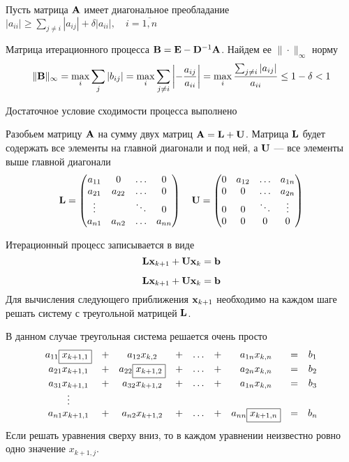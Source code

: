 \documentclass[professionalfonts,compress,unicode]{beamer}
\begin{document}
{
	Пусть матрица ${\bf A}$ имеет диагональное преобладание
	$|a_{ii}| \geq \sum_{j \neq i} |a_{ij}| + \delta |a_{ii}|, \quad i=\overline{1,n}$
	
	Матрица итерационного процесса ${\bf B} = {\bf E} - {\bf D}^{-1}{\bf A}$. Найдем ее $\|\cdot\|_\infty$ норму
	$$
	\|{\bf B}\|_\infty = \max_i\sum_j|b_{ij}| = \max_i \sum_{j\neq i} \left|-\frac{a_{ij}}{a_{ii}}\right| = 
	\max_i \frac{\sum_{j\neq i} |a_{ij}|}{a_{ii}} \leq 1-\delta < 1
	$$
	
	Достаточное условие сходимости процесса выполнено
}

{
	Разобьем матрицу ${\bf A}$ на сумму двух матриц ${\bf A} = {\bf L} + {\bf U}$. 
	Матрица ${\bf L}$ будет содержать все элементы на главной диагонали и под ней, а ${\bf U}$ --- все элементы 
	выше главной диагонали
	$$
	{\bf L} = \begin{pmatrix}
		a_{11}&0&\dots&0\\
		a_{21}&a_{22}&\dots&0\\
		\vdots&&\ddots&0\\
		a_{n1}&a_{n2}&\dots&a_{nn}
	\end{pmatrix}
	\quad
	{\bf U} = \begin{pmatrix}
		0&a_{12}&\dots&a_{1n}\\
		0&0&\dots&a_{2n}\\
		0&0&\ddots&\vdots\\
		0&0&0&0\\
	\end{pmatrix}
	$$
	
	Итерационный процесс записывается в виде
	$$
	{\bf L} {\bf x}_{k+1} + {\bf U} {\bf x}_k = {\bf b}
	$$
}

{
	$$
	{\bf L} {\bf x}_{k+1} + {\bf U} {\bf x}_k = {\bf b}
	$$
	Для вычисления следующего приближения ${\bf x}_{k+1}$ необходимо на каждом шаге решать систему с треугольной матрицей ${\bf L}$. 
	
	В данном случае треугольная система решается очень просто
	\begin{equation*}
	\begin{array}{ccccccccc}
	a_{11} \fbox{$x_{k+1,1}$} &+& a_{12} x_{k,2}  &+& \dots &+& a_{1n} x_{k,n} &=& b_1\\
	a_{21} x_{k+1,1} &+& a_{22} \fbox{$x_{k+1,2}$} &+& \dots &+& a_{2n} x_{k,n} &=& b_2\\
	a_{31} x_{k+1,1} &+& a_{32} x_{k+1,2} &+& \dots &+& a_{1n} x_{k,n} &=& b_3\\
	\vdots\\
	a_{n1} x_{k+1,1} &+& a_{n2} x_{k+1,2} &+& \dots &+& a_{nn} \fbox{$x_{k+1,n}$} &=& b_n
	\end{array}
	\end{equation*}
	Если решать уравнения сверху вниз, то в каждом уравнении неизвестно ровно одно значение $x_{k+1,j}$.
}
\end{document}
